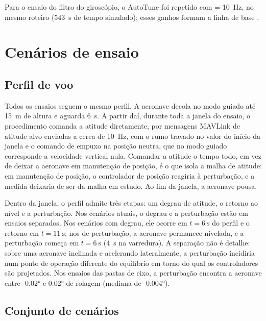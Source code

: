 Para o ensaio do filtro do giroscópio, o AutoTune foi repetido com
 = \SI{10}{\hertz}, no mesmo roteiro
(\SI{543}{\second} de tempo simulado); esses ganhos formam a linha de base
.

\section{Cenários de ensaio}
\label{sec:cenarios}

\subsection{Perfil de voo}
\label{sec:perfil-voo}

Todos os ensaios seguem o mesmo perfil. A aeronave decola no modo guiado até
\SI{15}{\metre} de altura e aguarda \SI{6}{\second}. A partir daí, durante
toda a janela do ensaio, o procedimento comanda a atitude diretamente, por
mensagens MAVLink de atitude alvo enviadas a cerca de \SI{10}{\hertz}, com o
rumo travado no valor do início da janela e o comando de empuxo na posição
neutra, que no modo guiado corresponde a velocidade vertical nula. Comandar a
atitude o tempo todo, em vez de deixar a aeronave em manutenção de posição, é
o que isola a malha de atitude: em manutenção de posição, o controlador de
posição reagiria à perturbação, e a medida deixaria de ser da malha em
estudo. Ao fim da janela, a aeronave pousa.

Dentro da janela, o perfil admite três etapas: um degrau de atitude, o
retorno ao nível e a perturbação. Nos cenários atuais, o degrau e a
perturbação estão em ensaios separados. Nos cenários com degrau, ele ocorre
em $t = \SI{6}{\second}$ do perfil e o retorno em $t = \SI{11}{\second}$;
nos de perturbação, a aeronave permanece nivelada, e a perturbação começa em
$t = \SI{6}{\second}$ (\SI{4}{\second} na varredura). A separação não é
detalhe: sobre uma aeronave inclinada e acelerando lateralmente, a
perturbação incidiria num ponto de operação diferente do equilíbrio em torno
do qual os controladores são projetados. Nos ensaios das pastas de eixo, a
perturbação encontra a aeronave entre \ang{-0.02} e \ang{0.02} de rolagem
(mediana de \ang{-0.004}).

\subsection{Conjunto de cenários}
\label{sec:conjunto-cenarios}


